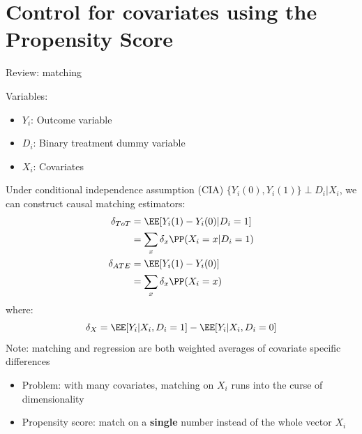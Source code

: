 \documentclass[compress, 8pt]{beamer}
\begin{document}
\section[Propensity Score]{Control for covariates using the Propensity Score}
\miniframesoff
\begin{frame}
    \tableofcontents[currentsection]
\end{frame}
\miniframeson




\begin{frame}{Review: matching}

Variables:
\begin{itemize}
    \item $Y_i$: Outcome variable
    \item $D_i$: Binary treatment dummy variable
    \item $X_i$: Covariates
\end{itemize}
Under conditional independence assumption (CIA) $\{Y_i(0), Y_i(1)\} \perp D_i \vert X_i$, we can construct causal matching estimators:
\begin{align*}
    \delta_{ToT} &= \EE [Y_i(1) - Y_i(0) \vert D_i = 1] \\
    &= \sum_x \delta_x \PP(X_i = x \vert D_i = 1) \\
    \delta_{ATE} &= \EE [Y_i(1) - Y_i(0)] \\
    &= \sum_x \delta_x \PP (X_i = x)
\end{align*}
where:
\begin{equation*}
    \delta_X = \EE [Y_i \vert X_i, D_i = 1] - \EE [Y_i \vert X_i, D_i = 0]
\end{equation*}
Note: matching and regression are both weighted averages of covariate specific differences
\begin{itemize}
    \item Problem: with many covariates, matching on $X_i$ runs into the curse of dimensionality
    \item Propensity score: match on a \textbf{single} number instead of the whole vector $X_i$
\end{itemize}

\end{frame}

\end{document}
